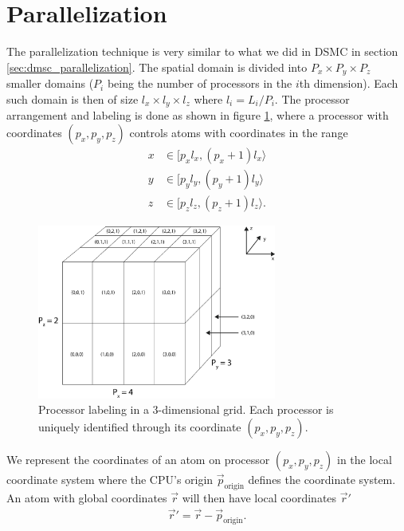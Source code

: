\section{Parallelization}
\label{sec:md_parallelization}
The parallelization technique is very similar to what we did in DSMC in section \ref{sec:dmsc_parallelization}. The spatial domain is divided into $P_x\times P_y\times P_z$ smaller domains ($P_i$ being the number of processors in the $i$th dimension). Each such domain is then of size $l_x\times l_y \times l_z$ where $l_i = L_i/P_i$. The processor arrangement and labeling is done as shown in figure \ref{fig:md_parallelization_2}, where a processor with coordinates $(p_x, p_y, p_z)$ controls atoms with coordinates in the range
\begin{align}
	\nonumber
	x&\in[p_xl_x, (p_x+1)l_x\rangle\\
	\nonumber
	y&\in[p_yl_y, (p_y+1)l_y\rangle\\
	z&\in[p_zl_z, (p_z+1)l_z\rangle.
\end{align}
\begin{figure}[h!]
\begin{center}
\includegraphics[width=0.7\textwidth, trim=0cm 0cm 0cm 0cm, clip]{DSMC/figures/parallelization_node_configuration.eps}
\end{center}
\caption{Processor labeling in a 3-dimensional grid. Each processor is uniquely identified through its coordinate $(p_x, p_y, p_z)$.}
\label{fig:md_parallelization_2}
\end{figure}
We represent the coordinates of an atom on processor $(p_x, p_y, p_z)$ in the local coordinate system where the CPU's origin $\vec p_\text{origin}$ defines the coordinate system. An atom with global coordinates $\vec r$ will then have local coordinates $\vec r'$
\begin{align}
	\vec r' = \vec r - \vec p_\text{origin}.
\end{align}
